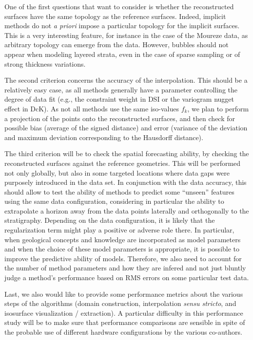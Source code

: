\documentclass[preprint]{elsarticle}
\begin{document}
One of the first questions that want to consider is whether the reconstructed surfaces have the same topology as the reference surfaces. Indeed, implicit methods do not \textit{a priori} impose a particular topology for the implicit surfaces. This is a very interesting feature, for instance in the case of the Moureze data, as arbitrary topology can emerge from the data. However, bubbles should not appear when modeling layered strata, even in the case of sparse sampling or of strong thickness variations. 


The second criterion concerns the accuracy of the interpolation. This should be a relatively easy case, as all methods generally have a parameter controlling the degree of data fit (e.g., the constraint weight in DSI or the variogram nugget effect in DcK). As not all methods use the same iso-values $f_k$, we plan to perform a projection of the points onto the reconstructed surfaces, and then check for possible bias (average of the signed distance) and error (variance of the deviation and maximum deviation corresponding to the Hausdorff distance). 

The third criterion will be to check the spatial forecasting ability, by checking the reconstructed surfaces against the reference geometries. This will be performed not only globally, but also in some targeted locations where data gaps were purposely introduced in the data set. In conjunction with the data accuracy, this should allow to test the ability of methods to predict some ``unseen'' features using the same data configuration, considering in particular the ability to extrapolate a horizon away from the data points laterally and orthogonally to the stratigraphy. Depending on the data configuration, it is likely that the regularization term might play a positive or adverse role there. In particular, when geological concepts and knowledge are incorporated as model parameters \citep[e.g.,][]{Laurent2016EaPSL,Grose2017JSG,Grose2018JGRSE,Grose2019JoSG} and when the choice of these model parameters is appropriate, it is possible to improve the predictive ability of models. Therefore, we also need to account for the number of method parameters and how they are infered and not just bluntly judge a method's performance based on RMS errors on some particular test data.  

Last, we also would like to provide some performance metrics about the various steps of the algorithms (domain construction, interpolation \textit{sensu stricto}, and isosurface visualization / extraction). A particular difficulty in this performance study will be to make sure that performance comparisons are sensible in spite of the probable use of different hardware configurations by the various co-authors. 
\end{document}
